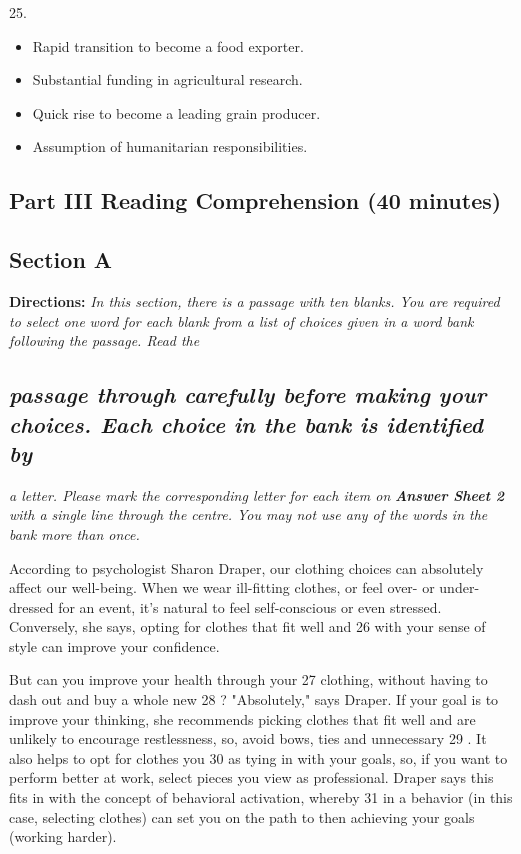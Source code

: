\documentclass[UTF8,11pt]{ctexart}
\begin{document}
25.


\begin{itemize}[leftmargin=2em,itemsep=.2em,topsep=.4em]\item[A.] Rapid transition to become a food exporter.
\item[B.] Substantial funding in agricultural research.
\item[C.] Quick rise to become a leading grain producer.
\item[D.] Assumption of humanitarian responsibilities.
\end{itemize}

\subsection*{\textbf{Part III} \textbf{Reading Comprehension} \textbf{(40 minutes)}}


\subsection*{\textbf{Section A}}


\textbf{Directions: }\textit{In this section, there is a passage with ten blanks. You are required to select one} \textit{word for each blank from a list of choices given in a word bank following the passage. Read the}


\subsection*{\textit{passage through carefully before making your choices. Each choice in the bank is identified by}}


\textit{a letter. Please mark the corresponding letter for each item on }\textbf{\textit{Answer Sheet 2 }}\textit{with a single} \textit{line through the centre. You may not use any of the words in the bank more than once.}


According to psychologist Sharon Draper, our clothing choices can absolutely affect our well-being. When we wear ill-fitting clothes, or feel over- or under-dressed for an event, it's natural to feel self-conscious or even stressed. Conversely, she says, opting for clothes that fit well and 26 with your sense of style can improve your confidence.


But can you improve your health through your 27 clothing, without having to dash out and buy a whole new 28 ? "Absolutely," says Draper. If your goal is to improve your thinking, she recommends picking clothes that fit well and are unlikely to encourage restlessness, so, avoid bows, ties and unnecessary 29 . It also helps to opt for clothes you 30 as tying in with your goals, so, if you want to perform better at work, select pieces you view as professional. Draper says this fits in with the concept of behavioral activation, whereby 31 in a behavior (in this case, selecting clothes) can set you on the path to then achieving your goals (working harder).
\end{document}
